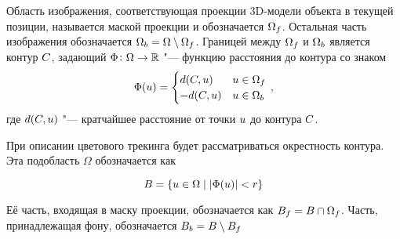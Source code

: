 Область изображения, соответствующая проекции 3D-модели объекта
в текущей позиции, называется маской проекции и обозначается $\Omega_f$.
Остальная часть изображения обозначается
$\Omega_b = \Omega \setminus \Omega_f$.
Границей между $\Omega_f$ и $\Omega_b$ является контур $C$,
задающий
$\Phi \colon \Omega \to \mathbb{R}$ "---
функцию расстояния до контура со знаком
\begin{equation*}
    \Phi(\mathnormal{u}) =
    \begin{cases}
        d(C, \mathnormal{u})  & \mathnormal{u} \in \Omega_f \\
        -d(C, \mathnormal{u})  & \mathnormal{u} \in \Omega_b
    \end{cases}
    \,\text{,}
\end{equation*}
где $d(C, \mathnormal{u})$ "--- кратчайшее расстояние от точки $\mathnormal{u}$
до контура $C$.

При описании цветового трекинга будет рассматриваться окрестность контура.
Эта подобласть $\Omega$ обозначается как 

\begin{equation*}
    B = \{ \mathnormal{u} \in \Omega \mid |\Phi(\mathnormal{u})| < r \}
\end{equation*}

Её часть, входящая в маску проекции, обозначается как
$B_{f} = B \cap \Omega_f$.
Часть, принадлежащая фону, обозначается
$B_{b} = B \setminus B_{f}$
